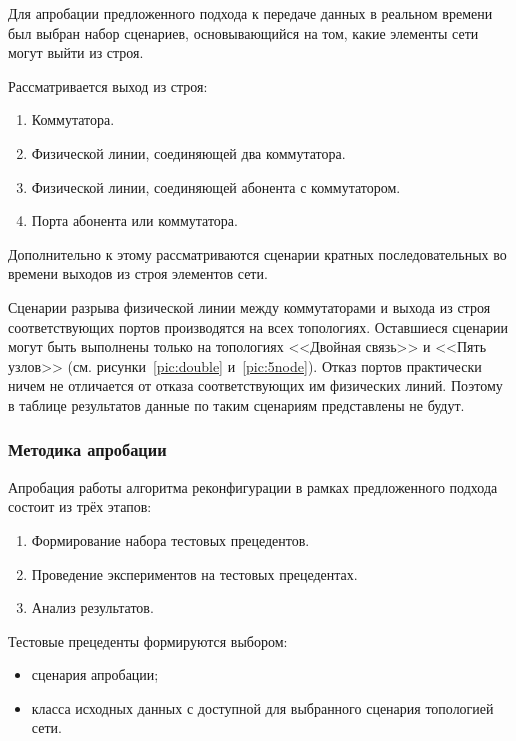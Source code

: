 \documentclass[12pt, a4paper]{article}
\begin{document}
Для апробации предложенного подхода к передаче данных в реальном времени был выбран набор сценариев, основывающийся на том, какие элементы сети могут выйти из строя. 

Рассматривается выход из строя:
\begin{enumerate}
	\item Коммутатора.
	\item Физической линии, соединяющей два коммутатора.
	\item Физической линии, соединяющей абонента с коммутатором.
	\item Порта абонента или коммутатора.
\end{enumerate}

Дополнительно к этому рассматриваются сценарии кратных последовательных во времени выходов из строя элементов сети.

Сценарии разрыва физической линии между коммутаторами и выхода из строя соответствующих портов производятся на всех топологиях. Оставшиеся сценарии могут быть выполнены только на топологиях <<Двойная связь>> и <<Пять узлов>> (см. рисунки~\ref{pic:double} и~\ref{pic:5node}). Отказ портов практически ничем не отличается от отказа соответствующих им физических линий. Поэтому в таблице результатов данные по таким сценариям представлены не будут.

\subsubsection{Методика апробации}
Апробация работы алгоритма реконфигурации в рамках предложенного подхода состоит из трёх этапов:
\begin{enumerate}
	\item Формирование набора тестовых прецедентов.
	\item Проведение экспериментов на тестовых прецедентах.
	\item Анализ результатов.
\end{enumerate}

Тестовые прецеденты формируются выбором:
\begin{itemize}
	\item сценария апробации;
	\item класса исходных данных с доступной для выбранного сценария топологией сети.
\end{itemize}
\end{document}
